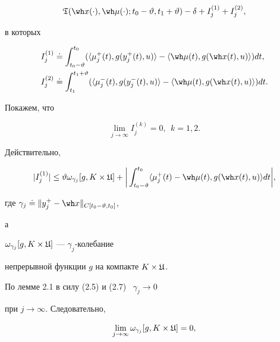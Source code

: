 \begin{pf}
\begin{multline*}
\frak T(\wh x(\cdot),\wh


\mu(\cdot);t_0-\vartheta,t_1+\vartheta)-\delta+I_{j}^{(1)}+I_{j}^{(2)},


\end{multline*}


в которых


\begin{align*} 


I_j^{(1)}&\doteq\int_{t_0-\vartheta}^{t_0}(\langle\mu_j^+(t),


g(y_j^+(t),u)\rangle-\langle\wh\mu(t),g(\wh x(t),u)\rangle)dt,\\


I_j^{(2)}&\doteq\int_{t_1}^{t_1+\vartheta}(\langle\mu_j^-(t),


g(y_j^-(t),u)\rangle-\langle\wh\mu(t),g(\wh x(t),u)\rangle)dt.


\end{align*}





Покажем, что


\begin{equation}


\lim_{j\to\infty}I_j^{(k)}=0,\ \ k=1,2.


\end{equation}


Действительно,


\begin{equation}


|I_j^{(1)}|\le\vartheta\omega_{\gamma_j}[g,K\times\frak U]+


\bigg|\int_{t_0-\vartheta}^{t_0}


\langle\mu_j^+(t)-\wh\mu(t),g(\wh x(t),u)\rangle dt\bigg|,


\end{equation}


где $\gamma_j\doteq\|y_j^+-\wh x\|_{C[t_0-\vartheta,t_0]}$,


а


$\omega_{\gamma_j}[g,K\times\frak U]$ --- $\gamma_j$-колебание


непрерывной функции $g$ на компакте $K\times\frak U$.


По лемме 2.1 в силу (2.5) и (2.7) \ $\gamma_j\to0$


при $j\to\infty$. Следовательно,


\begin{equation}


\lim_{j\to\infty}\omega_{\gamma_j}[g,K\times\frak U]=0,



\end{equation}
\end{pf}
